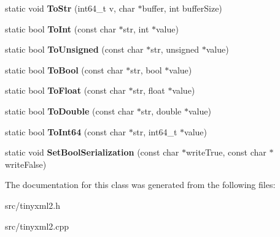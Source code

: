 \begin{DoxyCompactItemize}
static void {\bfseries To\+Str} (int64\+\_\+t v, char $\ast$buffer, int buffer\+Size)
\item 
\mbox{\label{classCPlantBox_1_1tinyxml2_1_1XMLUtil_a4476b99b913d5dbb2873f9700ee79187}} 
static bool {\bfseries To\+Int} (const char $\ast$str, int $\ast$value)
\item 
\mbox{\label{classCPlantBox_1_1tinyxml2_1_1XMLUtil_ac21b0677174bddf3e7ac3e4a5e1f99d2}} 
static bool {\bfseries To\+Unsigned} (const char $\ast$str, unsigned $\ast$value)
\item 
\mbox{\label{classCPlantBox_1_1tinyxml2_1_1XMLUtil_a73e723131bd3bbac166ba12666ca140f}} 
static bool {\bfseries To\+Bool} (const char $\ast$str, bool $\ast$value)
\item 
\mbox{\label{classCPlantBox_1_1tinyxml2_1_1XMLUtil_acad53257865bbcc2a7c2c51e7883e07c}} 
static bool {\bfseries To\+Float} (const char $\ast$str, float $\ast$value)
\item 
\mbox{\label{classCPlantBox_1_1tinyxml2_1_1XMLUtil_a9ec014e9d9f15673d94ec075019edaea}} 
static bool {\bfseries To\+Double} (const char $\ast$str, double $\ast$value)
\item 
\mbox{\label{classCPlantBox_1_1tinyxml2_1_1XMLUtil_af7a9001afebd961955f1ce57575e4692}} 
static bool {\bfseries To\+Int64} (const char $\ast$str, int64\+\_\+t $\ast$value)
\item 
\mbox{\label{classCPlantBox_1_1tinyxml2_1_1XMLUtil_a1af0fa7b889a245460c94168b7b0aae0}} 
static void {\bfseries Set\+Bool\+Serialization} (const char $\ast$write\+True, const char $\ast$write\+False)
\end{DoxyCompactItemize}


The documentation for this class was generated from the following files\+:\begin{DoxyCompactItemize}
\item 
src/tinyxml2.\+h\item 
src/tinyxml2.\+cpp\end{DoxyCompactItemize}
